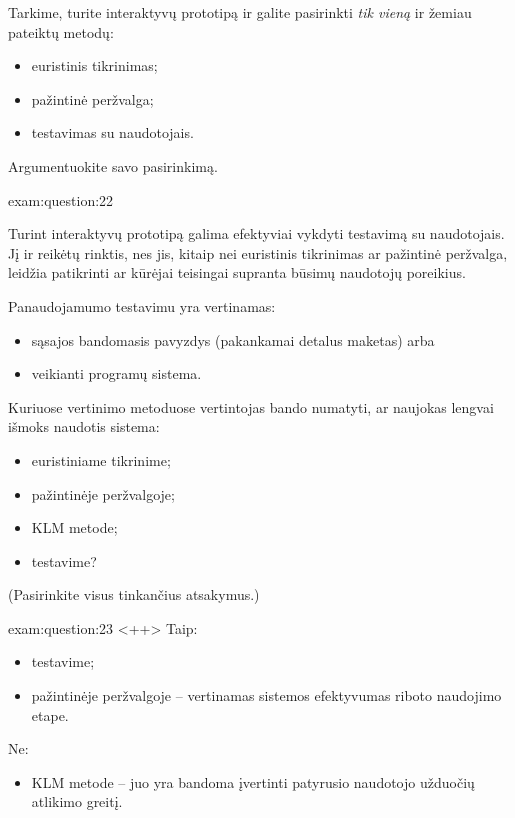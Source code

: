 \begin{question}{%
  Tarkime, turite interaktyvų prototipą ir galite pasirinkti \emph{tik
  vieną} ir žemiau pateiktų metodų:
  \begin{itemize}
    \item euristinis tikrinimas;
    \item pažintinė peržvalga;
    \item testavimas su naudotojais.
  \end{itemize}
  Argumentuokite savo pasirinkimą.
  }{exam:question:22}

  Turint interaktyvų prototipą galima efektyviai vykdyti testavimą
  su naudotojais. Jį ir reikėtų rinktis, nes jis, kitaip nei 
  euristinis tikrinimas ar pažintinė peržvalga, leidžia patikrinti
  ar kūrėjai teisingai supranta būsimų naudotojų poreikius.

  Panaudojamumo testavimu yra vertinamas\cite[8]{skaidres-8}:
  \begin{itemize}
    \item sąsajos bandomasis pavyzdys (pakankamai detalus maketas) arba
    \item veikianti programų sistema.
  \end{itemize}
\end{question}

\begin{question}{%
  Kuriuose vertinimo metoduose vertintojas bando numatyti, ar naujokas
  lengvai išmoks naudotis sistema:
  \begin{itemize}
    \item euristiniame tikrinime;
    \item pažintinėje peržvalgoje;
    \item KLM metode;
    \item testavime?
  \end{itemize}
  (Pasirinkite visus tinkančius atsakymus.)
  }{exam:question:23}
  <++>
  Taip:
  \begin{itemize}
    \item testavime;
    \item pažintinėje peržvalgoje – vertinamas sistemos efektyvumas riboto
      naudojimo etape.
  \end{itemize}

  Ne:
  \begin{itemize}
    \item KLM metode – juo yra bandoma įvertinti patyrusio naudotojo
      užduočių atlikimo greitį.
  \end{itemize}
\end{question}

